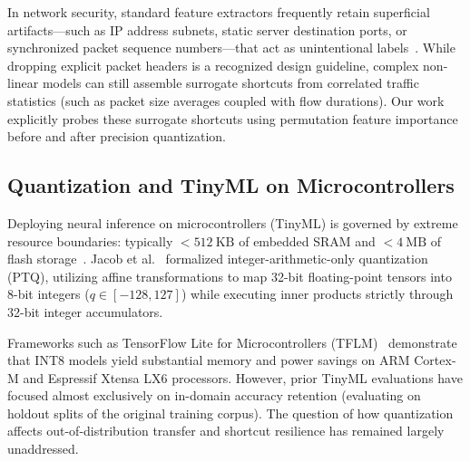 In network security, standard feature extractors frequently retain superficial artifacts—such as IP address subnets, static server destination ports, or synchronized packet sequence numbers—that act as unintentional labels~\cite{doriguzzi2020lucid}. While dropping explicit packet headers is a recognized design guideline, complex non-linear models can still assemble surrogate shortcuts from correlated traffic statistics (such as packet size averages coupled with flow durations). Our work explicitly probes these surrogate shortcuts using permutation feature importance before and after precision quantization.

\subsection{Quantization and TinyML on Microcontrollers}
Deploying neural inference on microcontrollers (TinyML) is governed by extreme resource boundaries: typically $<512\ \text{KB}$ of embedded SRAM and $<4\ \text{MB}$ of flash storage~\cite{warden2019tinyml, banbury2021benchmarking}. Jacob et al.~\cite{jacob2018quantization} formalized integer-arithmetic-only quantization (PTQ), utilizing affine transformations to map 32-bit floating-point tensors into 8-bit integers ($q \in [-128, 127]$) while executing inner products strictly through 32-bit integer accumulators.

Frameworks such as TensorFlow Lite for Microcontrollers (TFLM)~\cite{david2021tensorflow} demonstrate that INT8 models yield substantial memory and power savings on ARM Cortex-M and Espressif Xtensa LX6 processors. However, prior TinyML evaluations have focused almost exclusively on in-domain accuracy retention (evaluating on holdout splits of the original training corpus). The question of how quantization affects out-of-distribution transfer and shortcut resilience has remained largely unaddressed.

